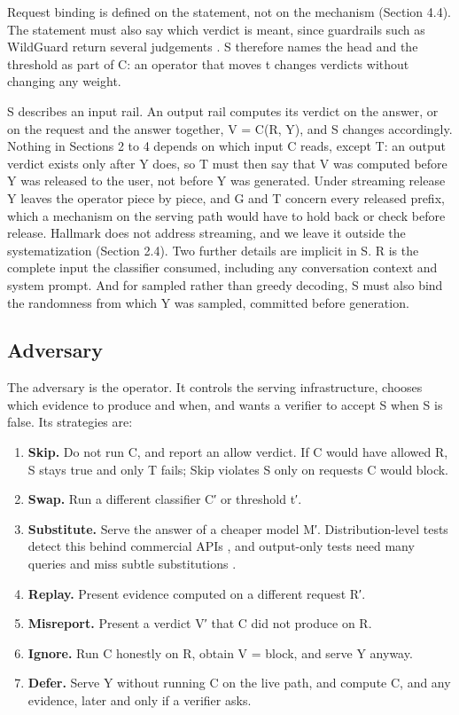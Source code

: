 \documentclass[11pt]{article}
\begin{document}
Request binding is defined on the statement, not on the mechanism (Section 4.4). The statement must also say which verdict is meant, since guardrails such as WildGuard return several judgements \cite{D9}. S therefore names the head and the threshold as part of C: an operator that moves t changes verdicts without changing any weight.

S describes an input rail. An output rail computes its verdict on the answer, or on the request and the answer together, V = C(R, Y), and S changes accordingly. Nothing in Sections 2 to 4 depends on which input C reads, except T: an output verdict exists only after Y does, so T must then say that V was computed before Y was released to the user, not before Y was generated. Under streaming release Y leaves the operator piece by piece, and G and T concern every released prefix, which a mechanism on the serving path would have to hold back or check before release. Hallmark does not address streaming, and we leave it outside the systematization (Section 2.4). Two further details are implicit in S. R is the complete input the classifier consumed, including any conversation context and system prompt. And for sampled rather than greedy decoding, S must also bind the randomness from which Y was sampled, committed before generation.

\subsection{Adversary}

The adversary is the operator. It controls the serving infrastructure, chooses which evidence to produce and when, and wants a verifier to accept S when S is false. Its strategies are:

\begin{enumerate}
\item \textbf{Skip.} Do not run C, and report an allow verdict. If C would have allowed R, S stays true and only T fails; Skip violates S only on requests C would block.
\item \textbf{Swap.} Run a different classifier C′ or threshold t′.
\item \textbf{Substitute.} Serve the answer of a cheaper model M′. Distribution-level tests detect this behind commercial APIs \cite{C14}, and output-only tests need many queries and miss subtle substitutions \cite{C15}.
\item \textbf{Replay.} Present evidence computed on a different request R′.
\item \textbf{Misreport.} Present a verdict V′ that C did not produce on R.
\item \textbf{Ignore.} Run C honestly on R, obtain V = block, and serve Y anyway.
\item \textbf{Defer.} Serve Y without running C on the live path, and compute C, and any evidence, later and only if a verifier asks.
\end{enumerate}
\end{document}
